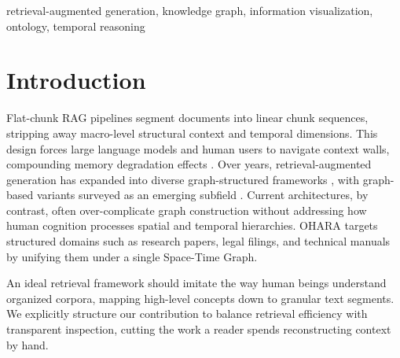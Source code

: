 \documentclass[conference,a4paper]{IEEEtran}
\begin{document}
\begin{IEEEkeywords}
retrieval-augmented generation, knowledge graph, information visualization, ontology, temporal reasoning
\end{IEEEkeywords}

\section{Introduction}

Flat-chunk RAG pipelines segment documents into linear chunk sequences, stripping away macro-level structural context and temporal dimensions. This design forces large language models and human users to navigate context walls, compounding memory degradation effects \cite{liu2024lost}. Over years, retrieval-augmented generation has expanded into diverse graph-structured frameworks \cite{gao2023ragsurvey}, with graph-based variants surveyed as an emerging subfield \cite{peng2024graphrag_survey}. Current architectures, by contrast, often over-complicate graph construction without addressing how human cognition processes spatial and temporal hierarchies. OHARA targets structured domains such as research papers, legal filings, and technical manuals by unifying them under a single Space-Time Graph.

An ideal retrieval framework should imitate the way human beings understand organized corpora, mapping high-level concepts down to granular text segments. We explicitly structure our contribution to balance retrieval efficiency with transparent inspection, cutting the work a reader spends reconstructing context by hand.
\end{document}
